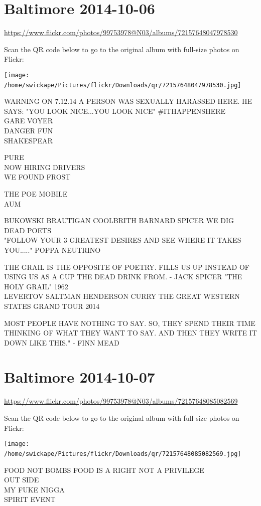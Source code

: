 \documentclass[10pt,letterpaper]{article}
\begin{document}
\section*{Baltimore 2014-10-06}

\url{https://www.flickr.com/photos/99753978@N03/albums/72157648047978530}

Scan the QR code below to go to the original album with full-size photos on Flickr:

\texttt{[image: /home/swickape/Pictures/flickr/Downloads/qr/72157648047978530.jpg]}
\

WARNING ON 7.12.14 A PERSON WAS SEXUALLY HARASSED HERE.  HE SAYS: "YOU LOOK NICE...YOU LOOK NICE" \#ITHAPPENSHERE\\
GARE VOYER\\
DANGER FUN\\
SHAKESPEAR

PURE\\
NOW HIRING DRIVERS\\
WE FOUND FROST

THE POE MOBILE\\
AUM

BUKOWSKI BRAUTIGAN COOLBRITH BARNARD SPICER WE DIG DEAD POETS\\
"FOLLOW YOUR 3 GREATEST DESIRES AND SEE WHERE IT TAKES YOU....." POPPA NEUTRINO

THE GRAIL IS THE OPPOSITE OF POETRY.  FILLS US UP INSTEAD OF USING US AS A CUP THE DEAD DRINK FROM.  {-} JACK SPICER "THE HOLY GRAIL" 1962\\
LEVERTOV SALTMAN HENDERSON CURRY THE GREAT WESTERN STATES GRAND TOUR 2014

MOST PEOPLE HAVE NOTHING TO SAY.  SO, THEY SPEND THEIR TIME THINKING OF WHAT THEY WANT TO SAY.  AND THEN THEY WRITE IT DOWN LIKE THIS." {-} FINN MEAD
\

\section*{Baltimore 2014-10-07}

\url{https://www.flickr.com/photos/99753978@N03/albums/72157648085082569}

Scan the QR code below to go to the original album with full-size photos on Flickr:

\texttt{[image: /home/swickape/Pictures/flickr/Downloads/qr/72157648085082569.jpg]}
\

FOOD NOT BOMBS FOOD IS A RIGHT NOT A PRIVILEGE\\
OUT SIDE\\
MY FUKE NIGGA\\
SPIRIT EVENT
\end{document}
